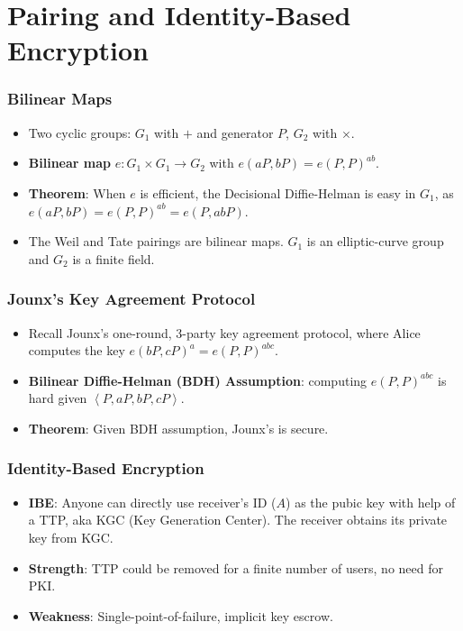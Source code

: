 \section{Pairing and Identity-Based Encryption}
\begin{frame}\frametitle{Bilinear Maps}
\begin{itemize}
\item Two cyclic groups: $G_1$ with $+$ and generator $P$, $G_2$ with $\times$.
\item \textbf{Bilinear map} $e: G_1 \times G_1 \to G_2$ with $e(aP, bP)=e(P,P)^{ab}$. 
\item \textbf{Theorem}: When $e$ is efficient, the Decisional Diffie-Helman is easy in $G_1$, as $e(aP, bP) = e(P, P)^{ab} = e(P, abP)$.
\item The Weil and Tate pairings are bilinear maps. $G_1$ is an elliptic-curve group and $G_2$ is a finite field.
\end{itemize}
\begin{figure}
\begin{center}

\end{center}
\end{figure}
\end{frame}
\begin{frame}\frametitle{Jounx's Key Agreement Protocol}
\begin{figure}
\begin{center}

\end{center}
\end{figure}
\begin{itemize}
\item Recall Jounx's one-round, 3-party key agreement protocol, where
Alice computes the key $e(bP, cP)^a = e(P, P)^{abc}$.
\item \textbf{Bilinear Diffie-Helman (BDH) Assumption}: computing $e(P, P)^{abc}$ is hard given $\left<P, aP, bP, cP \right>$.
\item \textbf{Theorem}: Given BDH assumption, Jounx's is secure.
\end{itemize}
\end{frame}
\begin{frame}\frametitle{Identity-Based Encryption}
\begin{itemize}
\item \textbf{IBE}: Anyone can directly use receiver's ID ($A$) as the pubic key with help of a TTP, aka KGC (Key Generation Center). The receiver obtains its private key from KGC.
\item \textbf{Strength}: TTP could be removed for a finite number of users, no need for PKI.
\item \textbf{Weakness}: Single-point-of-failure, implicit key escrow.
\end{itemize}
\begin{figure}
\begin{center}

\end{center}
\end{figure}
\end{frame}
